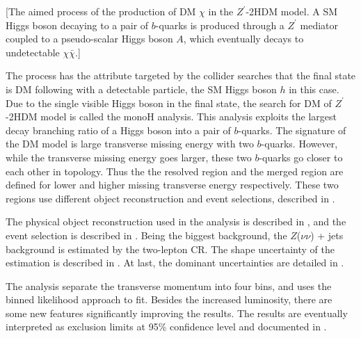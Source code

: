 \documentclass[class=NTHU_thesis, crop=false]{standalone}
\begin{document}
[The aimed process of the production of DM $\chi$ in the $Z^\prime$-2HDM model. A SM Higgs boson decaying to a pair of $b$-quarks is produced through a $Z^\prime$ mediator coupled to a pseudo-scalar Higgs boson $A$, which eventually decays to undetectable $\chi\bar{\chi}$.]

The process has the attribute targeted by the collider searches that the final state is DM following with a detectable particle, the SM Higgs boson $h$ in this case. Due to the single visible Higgs boson in the final state, the search for DM of $Z^\prime$-2HDM model is called the monoH analysis. This analysis exploits the largest decay branching ratio of a Higgs boson into a pair of $b$-quarks. The signature of the DM model is large transverse missing energy with two $b$-quarks. However, while the transverse missing energy goes larger, these two $b$-quarks go closer to each other in topology. Thus the the resolved region and the merged region are defined for lower and higher missing transverse energy respectively. These two regions use different object reconstruction and event selections, described in .

The physical object reconstruction used in the analysis is described in , and the event selection is described in . Being the biggest background, the $Z$($\nu\nu$) + jets background is estimated by the two-lepton CR. The shape uncertainty of the estimation is described in . At last, the dominant uncertainties are detailed in .

The analysis separate the transverse momentum into four bins, and uses the binned likelihood approach to fit. Besides the increased luminosity, there are some new features significantly improving the results. The results are eventually interpreted as exclusion limits at 95\% confidence level and documented in .
\end{document}
